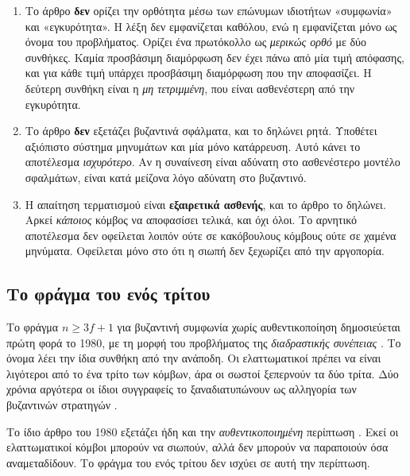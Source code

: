 \begin{enumerate}
  \item Το άρθρο \textbf{δεν} ορίζει την ορθότητα μέσω των επώνυμων
  ιδιοτήτων «συμφωνία» και «εγκυρότητα». Η λέξη  δεν
  εμφανίζεται καθόλου, ενώ η  εμφανίζεται μόνο ως όνομα
  του προβλήματος. Ορίζει ένα πρωτόκολλο ως \emph{μερικώς ορθό} με δύο
  συνθήκες. Καμία προσβάσιμη διαμόρφωση δεν έχει πάνω από μία τιμή
  απόφασης, και για κάθε τιμή υπάρχει προσβάσιμη διαμόρφωση που την
  αποφασίζει. Η δεύτερη συνθήκη είναι η \emph{μη τετριμμένη}, που είναι
  ασθενέστερη από την εγκυρότητα.
  \item Το άρθρο \textbf{δεν} εξετάζει βυζαντινά σφάλματα, και το
  δηλώνει ρητά. Υποθέτει αξιόπιστο σύστημα μηνυμάτων και μία μόνο
  κατάρρευση. Αυτό κάνει το αποτέλεσμα \emph{ισχυρότερο}. Αν η συναίνεση
  είναι αδύνατη στο ασθενέστερο μοντέλο σφαλμάτων, είναι κατά μείζονα
  λόγο αδύνατη στο βυζαντινό.
  \item Η απαίτηση τερματισμού είναι \textbf{εξαιρετικά ασθενής}, και το
  άρθρο το δηλώνει. Αρκεί \emph{κάποιος} κόμβος να αποφασίσει τελικά,
  και όχι όλοι. Το αρνητικό αποτέλεσμα δεν οφείλεται λοιπόν ούτε σε
  κακόβουλους κόμβους ούτε σε χαμένα μηνύματα. Οφείλεται μόνο στο ότι η
  σιωπή δεν ξεχωρίζει από την αργοπορία.
\end{enumerate}

\subsection{Το φράγμα του ενός τρίτου}

Το φράγμα $n \ge 3f+1$ για βυζαντινή συμφωνία χωρίς αυθεντικοποίηση
δημοσιεύεται πρώτη φορά το 1980, με τη μορφή του προβλήματος της
\emph{διαδραστικής συνέπειας} \cite{pease1980reaching}. Το όνομα λέει
την ίδια συνθήκη από την ανάποδη. Οι ελαττωματικοί πρέπει να είναι
λιγότεροι από το ένα τρίτο των κόμβων, άρα οι σωστοί ξεπερνούν τα δύο
τρίτα. Δύο χρόνια αργότερα οι ίδιοι συγγραφείς το ξαναδιατυπώνουν ως
αλληγορία των βυζαντινών στρατηγών \cite{lamport1982byzantine}.

Το ίδιο άρθρο του 1980 εξετάζει ήδη και την \emph{αυθεντικοποιημένη}
περίπτωση \cite{pease1980reaching}. Εκεί οι ελαττωματικοί κόμβοι μπορούν
να σιωπούν, αλλά δεν μπορούν να παραποιούν όσα αναμεταδίδουν. Το φράγμα
του ενός τρίτου δεν ισχύει σε αυτή την περίπτωση.

